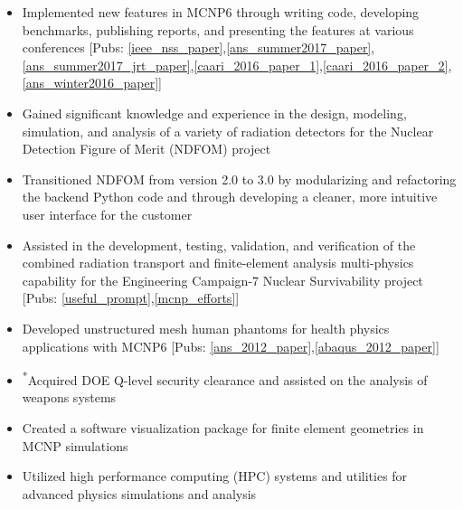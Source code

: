 \begin{center}
	\begin{minipage}{\textwidth}
	\begin{itemize}
	    \item Implemented new features in \textsc{MCNP6} through writing code, developing benchmarks, publishing reports, 
		    and presenting the features at various conferences [Pubs: \ref{ieee_nss_paper},\ref{ans_summer2017_paper},\ref{ans_summer2017_jrt_paper},\ref{caari_2016_paper_1},\ref{caari_2016_paper_2},\ref{ans_winter2016_paper}] 
	    \item Gained significant knowledge and experience in the design, modeling, simulation, and analysis 
		    of a variety of radiation detectors for the Nuclear Detection Figure of Merit (NDFOM) project
	    \item Transitioned NDFOM from version 2.0 to 3.0 by modularizing and refactoring the backend 
		   Python code and through developing a cleaner, more intuitive user interface for the customer
	    \item Assisted in the development, testing, validation, and verification of the combined radiation transport and 
		    finite-element analysis multi-physics capability for the Engineering Campaign-7 Nuclear Survivability project [Pubs: \ref{useful_prompt},\ref{mcnp_efforts}]
	    \item Developed unstructured mesh human phantoms for health physics applications with \textsc{MCNP6} [Pubs: \ref{ans_2012_paper},\ref{abaqus_2012_paper}]
	    \item \textsuperscript{*}Acquired DOE Q-level security clearance and assisted on the analysis of weapons systems
	    \item Created a software visualization package for finite element geometries in MCNP simulations
	    \item Utilized high performance computing (HPC) systems and utilities for advanced physics simulations and analysis

\end{itemize}
\end{minipage}
\end{center}
